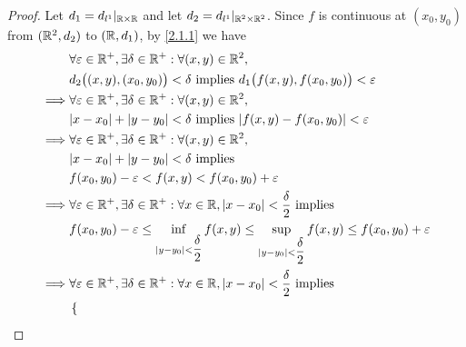 \begin{proof}
  Let \(d_1 = d_{l^1}|_{\mathbb{R} \times \mathbb{R}}\) and let \(d_2 = d_{l^1}|_{\mathbb{R}^2 \times \mathbb{R}^2}\).
  Since \(f\) is continuous at \((x_0, y_0)\) from \((\mathbb{R}^2, d_2)\) to \((\mathbb{R}, d_1)\), by \cref{2.1.1} we have
  \begin{align*}
             & \forall \varepsilon \in \R^+, \exists \delta \in \R^+ : \forall (x, y) \in \R^2,                                                                                     \\
             & d_2\big((x, y), (x_0, y_0)\big) < \delta \text{ implies } d_1\big(f(x, y), f(x_0, y_0)\big) < \varepsilon                                                            \\
    \implies & \forall \varepsilon \in \R^+, \exists \delta \in \R^+ : \forall (x, y) \in \R^2,                                                                                     \\
             & \abs{x - x_0} + \abs{y - y_0} < \delta \text{ implies } \abs{f(x, y) - f(x_0, y_0)} < \varepsilon                                                                    \\
    \implies & \forall \varepsilon \in \R^+, \exists \delta \in \R^+ : \forall (x, y) \in \R^2,                                                                                     \\
             & \abs{x - x_0} + \abs{y - y_0} < \delta \text{ implies}                                                                                                               \\
             & f(x_0, y_0) - \varepsilon < f(x, y) < f(x_0, y_0) + \varepsilon                                                                                                      \\
    \implies & \forall \varepsilon \in \R^+, \exists \delta \in \R^+ : \forall x \in \R, \abs{x - x_0} < \dfrac{\delta}{2} \text{ implies}                                          \\
             & f(x_0, y_0) - \varepsilon \leq \inf_{\abs{y - y_0} < \dfrac{\delta}{2}} f(x, y) \leq \sup_{\abs{y - y_0} < \dfrac{\delta}{2}} f(x, y) \leq f(x_0, y_0) + \varepsilon \\
    \implies & \forall \varepsilon \in \R^+, \exists \delta \in \R^+ : \forall x \in \R, \abs{x - x_0} < \dfrac{\delta}{2} \text{ implies}                                          \\
             & \begin{dcases}

\end{dcases}
\end{align*}
\end{proof}
